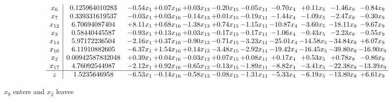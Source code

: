 \documentclass[9pt]{article}
\begin{document}
 \[\begin{array}{c| c c@{\hskip 2pt} c@{\hskip 2pt} c@{\hskip 2pt} c@{\hskip 2pt} c@{\hskip 2pt} c@{\hskip 2pt} c@{\hskip 2pt} c@{\hskip 2pt} c@{\hskip 2pt} }
 x_{6}   &  0.125964010283 & -0.54 x_{1} & +  0.07 x_{16} & +  0.03 x_{13} & -0.20 x_{15} & -0.05 x_{11} & -0.70 x_{4} & +  0.11 x_{5} & -1.46 x_{8} & -0.84 x_{9}\\
 x_{7}   &  0.339331619537 & -0.03 x_{1} & +  0.03 x_{16} & -0.14 x_{13} & +  0.01 x_{15} & -0.19 x_{11} & -1.44 x_{4} & -1.09 x_{5} & -2.47 x_{8} & -0.30 x_{9}\\
 x_{12}   &  6.70694087404 & +  8.11 x_{1} & +  0.68 x_{16} & -1.38 x_{13} & +  0.74 x_{15} & -1.15 x_{11} & -10.87 x_{4} & -3.60 x_{5} & -18.11 x_{8} & -9.67 x_{9}\\
 x_{3}   &  0.58440445587 & -0.93 x_{1} & +  0.13 x_{16} & +  0.03 x_{13} & -0.17 x_{15} & -0.17 x_{11} & -1.06 x_{4} & -0.43 x_{5} & -2.23 x_{8} & -0.55 x_{9}\\
 x_{14}   &  5.97172236504 & -2.16 x_{1} & +  0.37 x_{16} & -0.90 x_{13} & -0.71 x_{15} & -3.23 x_{11} & -25.01 x_{4} & -14.58 x_{5} & -34.84 x_{8} & +  6.07 x_{9}\\
 x_{10}   &  6.11910882605 & -6.37 x_{1} & +  1.54 x_{16} & +  0.14 x_{13} & -3.48 x_{15} & -2.92 x_{11} & -19.42 x_{4} & -16.45 x_{5} & -39.80 x_{8} & -16.90 x_{9}\\
 x_{2}   &  0.00942587832048 & +  0.39 x_{1} & +  0.04 x_{16} & -0.03 x_{13} & +  0.07 x_{15} & +  0.08 x_{11} & +  0.17 x_{4} & +  0.53 x_{5} & +  0.78 x_{8} & -0.86 x_{9}\\
 x_{17}   &  4.76092544987 & -2.12 x_{1} & +  0.92 x_{16} & -0.65 x_{13} & -0.13 x_{15} & -1.89 x_{11} & -8.82 x_{4} & -3.41 x_{5} & -22.38 x_{8} & -13.39 x_{9}\\
\hline
z    &  1.5235646958 & -6.53 x_{1} & -0.14 x_{16} & -0.58 x_{13} & -0.08 x_{15} & -1.31 x_{11} & -5.33 x_{4} & -6.19 x_{5} & -13.80 x_{8} & +  6.61 x_{9}\\
\end{array}\]


 $ x_{9} $ enters and $ x_{2} $ leaves 
\end{document}
